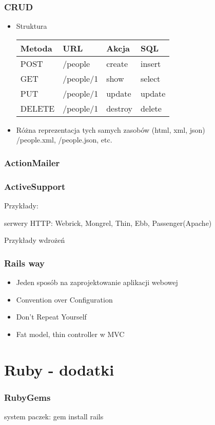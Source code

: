 \documentclass[12t]{beamer}
\begin{document}
\begin{frame}
  \frametitle{CRUD}
	\begin{itemize}
		\item	Struktura\\
			\begin{tabular}{l|l|l|l}
				Metoda & URL & Akcja & SQL \\
				\hline
				POST & /people & create & insert \\
				\hline
				GET & /people/1 & show & select\\
				\hline
				PUT & /people/1 & update & update\\
				\hline
				DELETE & /people/1 & destroy & delete\\
			\end{tabular}
		\item Różna reprezentacja tych samych zasobów (html, xml, json)\\
			/people.xml, /people.json, etc.
	\end{itemize}
\end{frame}

\begin{frame}
  \frametitle{ActionMailer}
\end{frame}

\begin{frame}
  \frametitle{ActiveSupport}
	Przykłady:
	
\end{frame}

\begin{frame}
  serwery HTTP: Webrick, Mongrel, Thin, Ebb, Passenger(Apache)
\end{frame}

\begin{frame}
  Przykłady wdrożeń
\end{frame}

\begin{frame}
  \frametitle{Rails way}
  \begin{itemize}
  \item Jeden sposób na zaprojektowanie aplikacji webowej
  \item Convention over Configuration
  \item Don't Repeat Yourself
  \item Fat model, thin controller w MVC
  \end{itemize}
\end{frame}

\section{Ruby - dodatki}
\begin{frame}
  \frametitle{RubyGems}
  system paczek: gem install rails
\end{frame}
\end{document}
